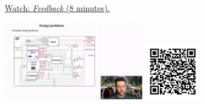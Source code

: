 
\begin{minipage}{10cm}
    \href{https://act4e-spring21.netlify.app/videos/spring2021-par-feedback:feedback.html}{Watch: \emph{Feedback} (8 minutes).}
        
    \href{https://act4e-spring21.netlify.app/videos/spring2021-par-feedback:feedback.html}{\includegraphics[height=3.5cm]{spring2021-par-feedback:feedback/thumbnails.jpg}}
    \href{https://act4e-spring21.netlify.app/videos/spring2021-par-feedback:feedback.html}{\includegraphics[height=2.5cm]{spring2021-par-feedback:feedback/qrcode.png}}
\end{minipage}
